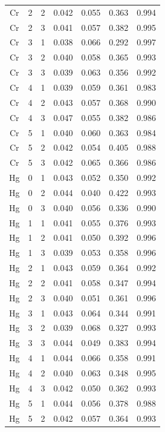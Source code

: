 \documentclass[ms, hidelinks]{uncgdissertationexp}
\theoremstyle{plain}
\theoremstyle{definition}
\theoremstyle{remark}
\begin{document}
\begin{longtable}{ccccccc}
Cr & 2 & 2 & 0.042 & 0.055 & 0.363 & 0.994\\
\rowcolor{gray!6}  Cr & 2 & 3 & 0.041 & 0.057 & 0.382 & 0.995\\
Cr & 3 & 1 & 0.038 & 0.066 & 0.292 & 0.997\\
\rowcolor{gray!6}  Cr & 3 & 2 & 0.040 & 0.058 & 0.365 & 0.993\\
Cr & 3 & 3 & 0.039 & 0.063 & 0.356 & 0.992\\
\rowcolor{gray!6}  Cr & 4 & 1 & 0.039 & 0.059 & 0.361 & 0.983\\
Cr & 4 & 2 & 0.043 & 0.057 & 0.368 & 0.990\\
\rowcolor{gray!6}  Cr & 4 & 3 & 0.047 & 0.055 & 0.382 & 0.986\\
Cr & 5 & 1 & 0.040 & 0.060 & 0.363 & 0.984\\
\rowcolor{gray!6}  Cr & 5 & 2 & 0.042 & 0.054 & 0.405 & 0.988\\
Cr & 5 & 3 & 0.042 & 0.065 & 0.366 & 0.986\\
\rowcolor{gray!6}  Hg & 0 & 1 & 0.043 & 0.052 & 0.350 & 0.992\\
Hg & 0 & 2 & 0.044 & 0.040 & 0.422 & 0.993\\
\rowcolor{gray!6}  Hg & 0 & 3 & 0.040 & 0.056 & 0.336 & 0.990\\
Hg & 1 & 1 & 0.041 & 0.055 & 0.376 & 0.993\\
\rowcolor{gray!6}  Hg & 1 & 2 & 0.041 & 0.050 & 0.392 & 0.996\\
Hg & 1 & 3 & 0.039 & 0.053 & 0.358 & 0.996\\
\rowcolor{gray!6}  Hg & 2 & 1 & 0.043 & 0.059 & 0.364 & 0.992\\
Hg & 2 & 2 & 0.041 & 0.058 & 0.347 & 0.994\\
\rowcolor{gray!6}  Hg & 2 & 3 & 0.040 & 0.051 & 0.361 & 0.996\\
Hg & 3 & 1 & 0.043 & 0.064 & 0.344 & 0.991\\
\rowcolor{gray!6}  Hg & 3 & 2 & 0.039 & 0.068 & 0.327 & 0.993\\
Hg & 3 & 3 & 0.044 & 0.049 & 0.383 & 0.994\\
\rowcolor{gray!6}  Hg & 4 & 1 & 0.044 & 0.066 & 0.358 & 0.991\\
Hg & 4 & 2 & 0.040 & 0.063 & 0.348 & 0.995\\
\rowcolor{gray!6}  Hg & 4 & 3 & 0.042 & 0.050 & 0.362 & 0.993\\
Hg & 5 & 1 & 0.044 & 0.056 & 0.378 & 0.988\\
\rowcolor{gray!6}  Hg & 5 & 2 & 0.042 & 0.057 & 0.364 & 0.993\\

\end{longtable}
\end{document}
